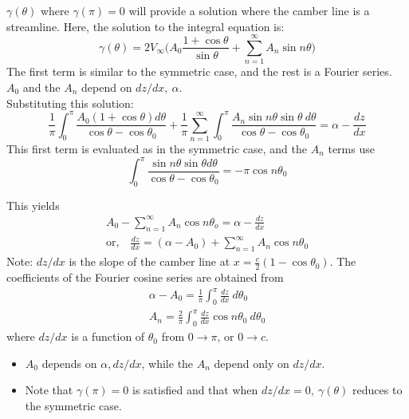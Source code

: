 \documentclass[draft=false, titlepage]{article}
\begin{document}
$\gamma(\theta)$ where $\gamma(\pi) = 0$ will provide a solution where the camber line is a streamline. Here, the solution to the integral equation is:
\begin{equation*}
    \gamma(\theta) = 2 V_\infty \Bigg( A_0 \frac{1+\cos\theta}{\sin\theta} + \sum_{n=1}^\infty A_n \sin n\theta\Bigg)
\end{equation*}
The first term is similar to the symmetric case, and the rest is a Fourier series. $A_0$ and the $A_n$ depend on $dz/dx,\ \alpha$.\\
Substituting this solution:
\begin{equation*}
    \frac{1}{\pi} \int_0^\pi \frac{A_0 (1+\cos\theta) d\theta}{\cos\theta - \cos\theta_0} + \frac{1}{\pi} \sum_{n=1}^\infty \int_0^\pi \frac{A_n \sin n\theta \sin\theta\ d\theta}{\cos\theta - \cos\theta_0} = \alpha -\frac{dz}{dx}
\end{equation*}
This first term is evaluated as in the symmetric case, and the $A_n$ terms use
\begin{equation*}
    \int_0^\pi \frac{\sin n\theta \sin\theta d\theta}{\cos\theta - \cos\theta_0} = -\pi \cos n\theta_0
\end{equation*}

This yields
\begin{gather*}
    A_0 - \sum_{n=1}^\infty A_n \cos n \theta_o = \alpha - \frac{dz}{dx}\\
    \text{or,} \quad \frac{dz}{dx} = (\alpha - A_0) + \sum_{n=1}^\infty A_n \cos n\theta_0
\end{gather*}
Note: $dz/dx$ is the slope of the camber line at $x=\frac{c}{2}(1-\cos\theta_0)$. The coefficients of the Fourier cosine series are obtained from
\begin{gather*}
    \alpha - A_0 = \frac{1}{\pi} \int_0^\pi \frac{dz}{dx}\ d\theta_0\\
    A_n = \frac{2}{\pi} \int_0^\pi \frac{dz}{dx} \cos n\theta_0\ d\theta_0
\end{gather*}
where $dz/dx$ is a function of $\theta_0$ from $0 \rightarrow \pi$, or $0 \rightarrow c$.
\begin{itemize}
    \item $A_0$ depends on $\alpha, dz/dx$, while the $A_n$ depend only on $dz/dx$.
    \item Note that $\gamma(\pi) = 0$ is satisfied and that when $dz/dx=0,\ \gamma(\theta)$ reduces to the symmetric case.
\end{itemize}
\end{document}
